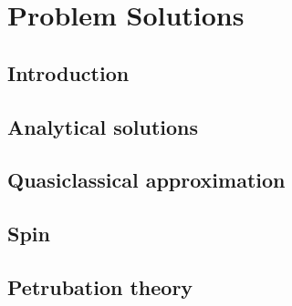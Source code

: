 \section{Problem Solutions}
	\subsection{Introduction}
	\subsection{Analytical solutions}
	\subsection{Quasiclassical approximation}
	\subsection{Spin}			
	\subsection{Petrubation theory}				